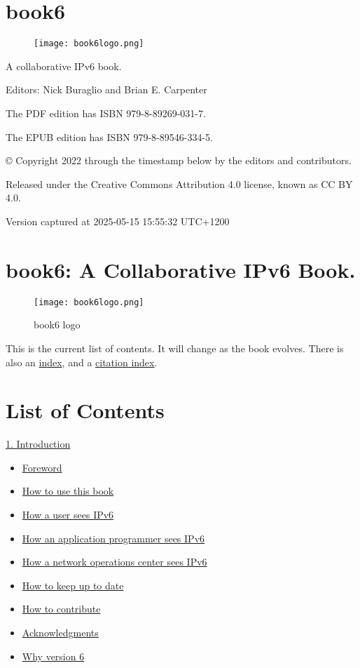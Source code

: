 \documentclass[
]{article}
\author{}
\date{}
\providecommand{\tightlist}{%
  \setlength{\itemsep}{0pt}\setlength{\parskip}{0pt}}
\begin{document}
\section{book6}\label{book6}

\begin{figure}
\centering
\texttt{[image: book6logo.png]}
\caption{}
\end{figure}

A collaborative IPv6 book.

Editors: Nick Buraglio and Brian E. Carpenter

The PDF edition has ISBN 979-8-89269-031-7.

The EPUB edition has ISBN 979-8-89546-334-5.

© Copyright 2022 through the timestamp below by the editors and
contributors.

Released under the Creative Commons Attribution 4.0 license, known as CC
BY 4.0.

Version captured at 2025-05-15 15:55:32 UTC+1200

\pagebreak

\section{book6: A Collaborative IPv6
Book.}\label{book6-a-collaborative-ipv6-book}

\begin{figure}
\centering
\texttt{[image: book6logo.png]}
\caption{book6 logo}
\end{figure}

This is the current list of contents. It will change as the book
evolves. There is also an \hyperref[book6-main-index]{index}, and a
\hyperref[book6-citation-index]{citation index}.

\section{List of Contents}\label{list-of-contents}

\hyperref[introduction-and-foreword]{1. Introduction}

\begin{itemize}
\tightlist
\item
  \hyperref[foreword]{Foreword}
\item
  \hyperref[how-to-use-this-book]{How to use this book}
\item
  \hyperref[how-a-user-sees-ipv6]{How a user sees IPv6}
\item
  \hyperref[how-an-application-programmer-sees-ipv6]{How an application
  programmer sees IPv6}
\item
  \hyperref[how-a-network-operations-center-sees-ipv6]{How a network
  operations center sees IPv6}
\item
  \hyperref[how-to-keep-up-to-date]{How to keep up to date}
\item
  \hyperref[how-to-contribute]{How to contribute}
\item
  \hyperref[acknowledgments]{Acknowledgments}
\item
  \hyperref[why-version-6]{Why version 6}
\end{itemize}
\end{document}
